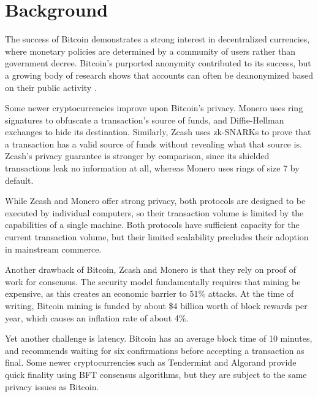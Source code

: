 \section{Background}
\label{background}

The success of Bitcoin demonstrates a strong interest in decentralized currencies, where monetary policies are determined by a community of users rather than government decree. Bitcoin's purported anonymity contributed to its success, but a growing body of research shows that accounts can often be deanonymized based on their public activity \cite{meiklejohn2013fistful} \cite{androulaki2013evaluating}.

Some newer cryptocurrencies improve upon Bitcoin's privacy. Monero \cite{van2013cryptonote} uses ring signatures to obfuscate a transaction's source of funds, and Diffie-Hellman exchanges to hide its destination. Similarly, Zcash \cite{sasson2014zerocash} uses zk-SNARKs to prove that a transaction has a valid source of funds without revealing what that source is. Zcash's privacy guarantee is stronger by comparison, since its shielded transactions leak no information at all, whereas Monero uses rings of size 7 by default.

While Zcash and Monero offer strong privacy, both protocols are designed to be executed by individual computers, so their transaction volume is limited by the capabilities of a single machine. Both protocols have sufficient capacity for the current transaction volume, but their limited scalability precludes their adoption in mainstream commerce.

Another drawback of Bitcoin, Zcash and Monero is that they rely on proof of work for consensus. The security model fundamentally requires that mining be expensive, as this creates an economic barrier to 51\% attacks. At the time of writing, Bitcoin mining is funded by about \$4 billion worth of block rewards per year, which causes an inflation rate of about 4\%.%

Yet another challenge is latency. Bitcoin has an average block time of 10 minutes, and \cite{nakamoto2008bitcoin} recommends waiting for six confirmations before accepting a transaction as final. Some newer cryptocurrencies such as Tendermint \cite{kwon2014tendermint} and Algorand \cite{chen2018algorand} provide quick finality using BFT consensus algorithms, but they are subject to the same privacy issues as Bitcoin.

